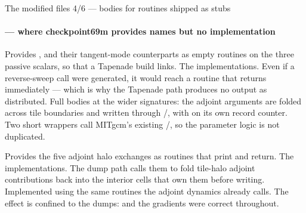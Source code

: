 \begin{frame}{The modified files 4/6 --- bodies for routines shipped as stubs}
  \framesubtitle{ --- where checkpoint69m provides names but no implementation}

{Provides ,  and their
tangent-mode counterparts as empty routines on the three passive scalars, so
that a Tapenade build links.}
{The implementations. Even if a reverse-sweep call were generated, it would
reach a routine that returns immediately --- which is why the Tapenade path
produces no  output as distributed.}
{Full bodies at the wider signatures: the adjoint arguments are folded across
tile boundaries and written through /, with
 on its own record counter. Two short wrappers call MITgcm's
existing /, so the parameter logic is
not duplicated.}

{Provides the five  adjoint halo exchanges as routines that
print  and return.}
{The implementations. The dump path calls them to fold tile-halo adjoint
contributions back into the interior cells that own them before writing.}
{Implemented using the same  routines the adjoint
dynamics already calls. The effect is confined to the dumps:  and the
 gradients were correct throughout.}

\end{frame}


